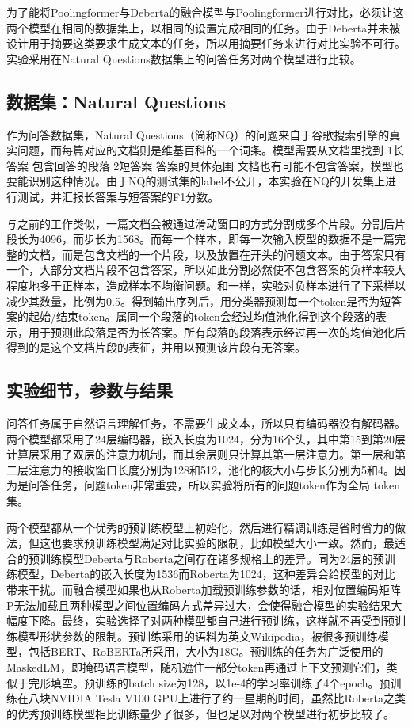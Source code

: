 为了能将Poolingformer与Deberta的融合模型与Poolingformer进行对比，必须让这两个模型在相同的数据集上，以相同的设置完成相同的任务。由于Deberta并未被设计用于摘要这类要求生成文本的任务，所以用摘要任务来进行对比实验不可行。实验采用在Natural Questions数据集上的问答任务对两个模型进行比较。

\subsection{数据集：Natural Questions}

作为问答数据集，Natural Questions（简称NQ）的问题来自于谷歌搜索引擎的真实问题，而每篇对应的文档则是维基百科的一个词条。模型需要从文档里找到
1长答案 包含回答的段落
2短答案 答案的具体范围
文档也有可能不包含答案，模型也要能识别这种情况。由于NQ的测试集的label不公开，本实验在NQ的开发集上进行测试，并汇报长答案与短答案的F1分数。

与之前的工作\cite{alberti2019bert}类似，一篇文档会被通过滑动窗口的方式分割成多个片段。分割后片段长为4096，而步长为1568。而每一个样本，即每一次输入模型的数据不是一篇完整的文档，而是包含文档的一个片段，以及放置在开头的问题文本。由于答案只有一个，大部分文档片段不包含答案，所以如此分割必然使不包含答案的负样本较大程度地多于正样本，造成样本不均衡问题。和\cite{liu2020rikinet}一样，实验对负样本进行了下采样以减少其数量，比例为0.5。得到输出序列后，用分类器预测每一个token是否为短答案的起始/结束token。属同一个段落的token会经过均值池化得到这个段落的表示，用于预测此段落是否为长答案。所有段落的段落表示经过再一次的均值池化后得到的是这个文档片段的表征，并用以预测该片段有无答案。

\subsection{实验细节，参数与结果}

问答任务属于自然语言理解任务，不需要生成文本，所以只有编码器没有解码器。两个模型都采用了24层编码器，嵌入长度为1024，分为16个头，其中第15到第20层计算层采用了双层的注意力机制，而其余层则只计算其第一层注意力。第一层和第二层注意力的接收窗口长度分别为128和512，池化的核大小与步长分别为5和4。因为是问答任务，问题token非常重要，所以实验将所有的问题token作为全局 token集。

两个模型都从一个优秀的预训练模型上初始化，然后进行精调训练是省时省力的做法，但这也要求预训练模型满足对比实验的限制，比如模型大小一致。然而，最适合的预训练模型Deberta与Roberta\cite{liu2019roberta}之间存在诸多规格上的差异。同为24层的预训练模型，Deberta的嵌入长度为1536而Roberta为1024，这种差异会给模型的对比带来干扰。而融合模型如果也从Roberta加载预训练参数的话，相对位置编码矩阵P无法加载且两种模型之间位置编码方式差异过大，会使得融合模型的实验结果大幅度下降。最终，实验选择了对两种模型都自己进行预训练，这样就不再受到预训练模型形状参数的限制。预训练采用的语料为英文Wikipedia，被很多预训练模型，包括BERT\cite{devlin2018bert}、RoBERTa\cite{liu2019roberta}所采用，大小为18G。预训练的任务为广泛使用的MaskedLM\cite{devlin2018bert}，即掩码语言模型，随机遮住一部分token再通过上下文预测它们，类似于完形填空。预训练的batch size为128，以1e-4的学习率训练了4个epoch。预训练在八块NVIDIA Tesla V100 GPU上进行了约一星期的时间，虽然比Roberta之类的优秀预训练模型相比训练量少了很多，但也足以对两个模型进行初步比较了。


